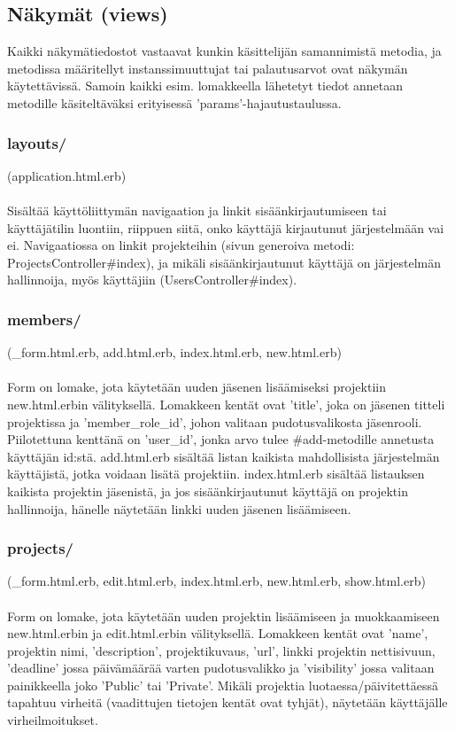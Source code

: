 \documentclass[12pt,a4paper]{article}
\begin{document}
\subsection*{Näkymät (views)}
Kaikki näkymätiedostot vastaavat kunkin käsittelijän samannimistä metodia, ja metodissa
määritellyt instanssimuuttujat tai palautusarvot ovat näkymän käytettävissä. Samoin kaikki
esim. lomakkeella lähetetyt tiedot annetaan metodille käsiteltäväksi erityisessä 'params'-hajautustaulussa.
\subsubsection*{layouts/}
(application.html.erb)\\\\
Sisältää käyttöliittymän navigaation ja linkit sisäänkirjautumiseen tai käyttäjätilin luontiin,
riippuen siitä, onko käyttäjä kirjautunut järjestelmään vai ei.
Navigaatiossa on linkit projekteihin (sivun generoiva metodi: ProjectsController\#index), ja
mikäli sisäänkirjautunut käyttäjä on järjestelmän hallinnoija, myös käyttäjiin
(UsersController\#index).
\subsubsection*{members/}
(\_form.html.erb, add.html.erb, index.html.erb, new.html.erb)\\\\
Form on lomake, jota käytetään uuden jäsenen lisäämiseksi projektiin new.html.erbin
välityksellä. Lomakkeen kentät ovat 'title', joka on jäsenen titteli projektissa ja
'member\_role\_id', johon valitaan pudotusvalikosta jäsenrooli. Piilotettuna kenttänä on
'user\_id', jonka arvo tulee \#add-metodille annetusta käyttäjän id:stä.
add.html.erb sisältää listan kaikista mahdollisista järjestelmän käyttäjistä, jotka voidaan
lisätä projektiin.
index.html.erb sisältää listauksen kaikista projektin jäsenistä, ja jos sisäänkirjautunut
käyttäjä on projektin hallinnoija, hänelle näytetään linkki uuden jäsenen lisäämiseen.
\subsubsection*{projects/}
(\_form.html.erb, edit.html.erb, index.html.erb, new.html.erb, show.html.erb)\\\\
Form on lomake, jota käytetään uuden projektin lisäämiseen ja muokkaamiseen
new.html.erbin ja edit.html.erbin välityksellä. Lomakkeen kentät ovat 'name', projektin nimi, 'description', projektikuvaus, 'url', linkki projektin nettisivuun, 'deadline' jossa päivämäärää varten pudotusvalikko ja 'visibility' jossa
valitaan painikkeella joko 'Public' tai 'Private'. Mikäli projektia luotaessa/päivitettäessä
tapahtuu virheitä (vaadittujen tietojen kentät ovat tyhjät), näytetään käyttäjälle
virheilmoitukset.
\end{document}
